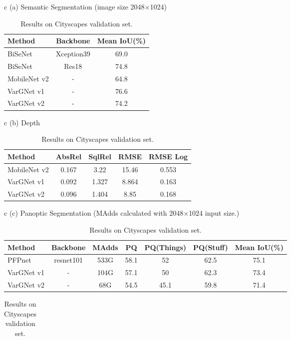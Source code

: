 \documentclass{article}
\begin{document}
\begin{table}
  \centering
  \caption{Results on Cityscapes validation set.}\label{tab:cs_res}
  \begin{tabular}{c}
    (a) Semantic Segmentation (image size 2048$\times$1024)\\
    \begin{tabular}{lcc}
    \toprule
    Method & Backbone & Mean IoU(\%)  \\ \midrule
    BiSeNet\cite{yu2018bisenet} & Xception39 & 69.0 \\
    BiSeNet\cite{yu2018bisenet} & Res18 & 74.8 \\ \midrule
    MobileNet v2 & - & 64.8 \\ \midrule
    VarGNet v1 & - & 76.6 \\
    VarGNet v2 & - & 74.2 \\
\bottomrule
    \end{tabular} 
  \end{tabular}   
\begin{tabular}{c}
    (b) Depth \\
    \begin{tabular}{lcccc}
      \toprule
      Method & AbsRel & SqlRel & RMSE & RMSE Log \\ \midrule
      MobileNet v2 & 0.167 & 3.22 & 15.46 & 0.553 \\ \midrule
      VarGNet v1 & 0.092 & 1.327 & 8.864 & 0.163 \\
VarGNet v2 & 0.096 & 1.404 & 8.85 & 0.168 \\ 
      \bottomrule
    \end{tabular}   
  \end{tabular}   
  \begin{tabular}{c}
    (c) Panoptic Segmentation (MAdds calculated with 2048$\times$1024 input size.) \\
    \begin{tabular}{lcccccc}
      \toprule
      Method & Backbone & MAdds & PQ & PQ(Things) & PQ(Stuff) & Mean IoU(\%)  \\ \midrule
      PFPnet\cite{Panoptic} & resnet101 & 533G & 58.1 & 52 & 62.5 & 75.1 \\
      VarGNet v1 & - & 104G & 57.1 & 50 & 62.3 & 73.4 \\
      VarGNet v2 & - & 68G & 54.5 & 45.1 & 59.8 & 71.4 \\
      \bottomrule
    \end{tabular}   
  \end{tabular}  
  \begin{tabular}{c}

\end{tabular}
\end{table}
\end{document}
